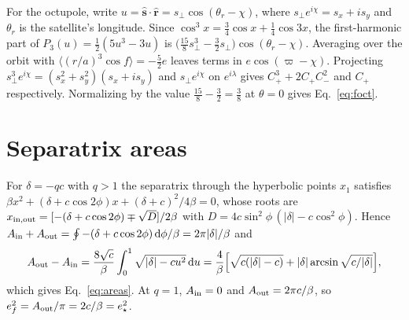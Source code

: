 \documentclass[11pt,a4paper]{article}
\newcommand{\estar}{e_\star}
\newcommand{\dd}{\mathrm{d}}
\begin{document}
For the octupole, write $u=\hat{\bm s}\cdot\hat{\bm r}=s_\perp\cos(\theta_r-\chi)$, where $s_\perp e^{i\chi}=s_x+is_y$ and $\theta_r$ is the satellite's longitude. Since $\cos^3x=\tfrac34\cos x+\tfrac14\cos3x$, the first-harmonic part of $P_3(u)=\tfrac12(5u^3-3u)$ is $\big(\tfrac{15}{8}s_\perp^3-\tfrac32s_\perp\big)\cos(\theta_r-\chi)$. Averaging over the orbit with $\langle(r/a)^3\cos f\rangle=-\tfrac52e$ leaves terms in $e\cos(\varpi-\chi)$. Projecting $s_\perp^3e^{i\chi}=(s_x^2+s_y^2)(s_x+is_y)$ and $s_\perp e^{i\chi}$ on $e^{i\lambda}$ gives $C_+^3+2C_+C_-^2$ and $C_+$ respectively. Normalizing by the value $\tfrac{15}{8}-\tfrac32=\tfrac38$ at $\theta=0$ gives Eq.~\eqref{eq:foct}.

\section{Separatrix areas}\label{app:areas}

For $\delta=-qc$ with $q>1$ the separatrix through the hyperbolic points $x_1$ satisfies $\beta x^2+(\delta+c\cos2\phi)x+(\delta+c)^2/4\beta=0$, whose roots are $x_{\rm in,out}=[-(\delta+c\cos2\phi)\mp\sqrt{D}]/2\beta$ with $D=4c\sin^2\phi\,(|\delta|-c\cos^2\phi)$. Hence $A_{\rm in}+A_{\rm out}=\oint-(\delta+c\cos2\phi)\,\dd\phi/\beta=2\pi|\delta|/\beta$ and
\begin{equation}
A_{\rm out}-A_{\rm in}=\frac{8\sqrt c}{\beta}\int_0^1\sqrt{|\delta|-cu^2}\,\dd u=\frac{4}{\beta}\Big[\sqrt{c(|\delta|-c)}+|\delta|\arcsin\sqrt{c/|\delta|}\Big],
\end{equation}
which gives Eq.~\eqref{eq:areas}. At $q=1$, $A_{\rm in}=0$ and $A_{\rm out}=2\pi c/\beta$, so $e_f^2=A_{\rm out}/\pi=2c/\beta=\estar^2$.
\end{document}
